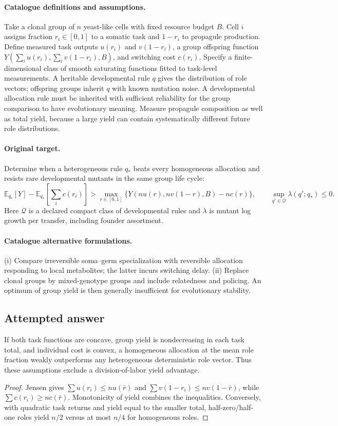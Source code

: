 \documentclass[11pt]{article}
\begin{document}
\paragraph{Catalogue definitions and assumptions.}
Take a clonal group of $n$ yeast-like cells with fixed resource budget $B$. Cell $i$ assigns fraction $r_i\in[0,1]$ to a somatic task and $1-r_i$ to propagule production. Define measured task outputs $u(r_i)$ and $v(1-r_i)$, a group offspring function $Y(\sum_i u(r_i),\sum_i v(1-r_i),B)$, and switching cost $c(r_i)$. Specify a finite-dimensional class of smooth saturating functions fitted to task-level measurements. A heritable developmental rule $q$ gives the distribution of role vectors; offspring groups inherit $q$ with known mutation noise. A developmental allocation rule must be inherited with sufficient reliability for the group comparison to have evolutionary meaning. Measure propagule composition as well as total yield, because a large yield can contain systematically different future role distributions.
\paragraph{Original target.}
Determine when a heterogeneous rule $q_*$ beats every homogeneous allocation and resists rare developmental mutants in the same group life cycle:
\[
 \mathbb{E}_{q_*}[Y]-\mathbb{E}_{q_*}\!\left[\sum_i c(r_i)\right]
 >\max_{r\in[0,1]}\{Y(nu(r),nv(1-r),B)-nc(r)\},
 \qquad \sup_{q'\in\mathcal Q}\lambda(q';q_*)\le0.
\]
Here $\mathcal Q$ is a declared compact class of developmental rules and $\lambda$ is mutant log growth per transfer, including founder assortment.
\paragraph{Catalogue alternative formulations.}
(i) Compare irreversible soma--germ specialization with reversible allocation responding to local metabolites; the latter incurs switching delay. (ii) Replace clonal groups by mixed-genotype groups and include relatedness and policing. An optimum of group yield is then generally insufficient for evolutionary stability.
\subsection{Attempted answer}
\begin{proposition}
If both task functions are concave, group yield is nondecreasing in each task total, and individual cost is convex, a homogeneous allocation at the mean role fraction weakly outperforms any heterogeneous deterministic role vector. Thus these assumptions exclude a division-of-labor yield advantage.
\end{proposition}
\begin{proof}
Jensen gives $\sum u(r_i)\leq nu(\bar r)$ and $\sum v(1-r_i)\leq nv(1-\bar r)$, while $\sum c(r_i)\geq nc(\bar r)$. Monotonicity of yield combines the inequalities. Conversely, with quadratic task returns and yield equal to the smaller total, half-zero/half-one roles yield $n/2$ versus at most $n/4$ for homogeneous roles.
\end{proof}
\end{document}
